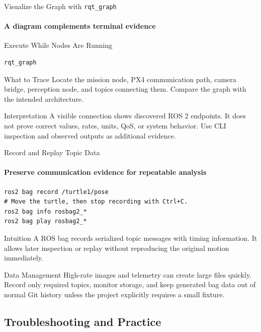 \begin{frame}[fragile]{Visualize the Graph with \texttt{rqt\_graph}}
\framesubtitle{A diagram complements terminal evidence}
\begin{block}{Execute While Nodes Are Running}
\begin{verbatim}
rqt_graph
\end{verbatim}
\end{block}
\begin{exampleblock}{What to Trace}
Locate the mission node, PX4 communication path, camera bridge, perception node, and topics connecting them. Compare the graph with the intended architecture.
\end{exampleblock}
\begin{alertblock}{Interpretation}
A visible connection shows discovered ROS 2 endpoints. It does not prove correct values, rates, units, QoS, or system behavior. Use CLI inspection and observed outputs as additional evidence.
\end{alertblock}
\end{frame}

\begin{frame}[fragile]{Record and Replay Topic Data}
\framesubtitle{Preserve communication evidence for repeatable analysis}
\begin{verbatim}
ros2 bag record /turtle1/pose
# Move the turtle, then stop recording with Ctrl+C.
ros2 bag info rosbag2_*
ros2 bag play rosbag2_*
\end{verbatim}
\begin{block}{Intuition}
A ROS bag records serialized topic messages with timing information. It allows later inspection or replay without reproducing the original motion immediately.
\end{block}
\begin{alertblock}{Data Management}
High-rate images and telemetry can create large files quickly. Record only required topics, monitor storage, and keep generated bag data out of normal Git history unless the project explicitly requires a small fixture.
\end{alertblock}
\end{frame}

\subsection{Troubleshooting and Practice}

